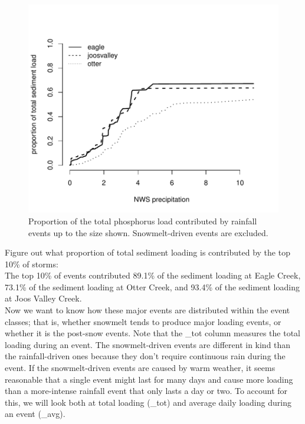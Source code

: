 \documentclass[12pt]{article}
\begin{document}
\begin{figure}
    \begin{center}
\includegraphics{loadings-figure1}
    \end{center}
    \caption{Proportion of the total phosphorus load contributed by rainfall events up to the size shown. Snowmelt-driven events are excluded.\label{cdf}}
\end{figure}



Figure out what proportion of total sediment loading is contributed by the top 10\% of storms:\\








The top 10\% of events contributed 89.1\% of the sediment loading at Eagle Creek, 73.1\% of the sediment loading at Otter Creek, and 93.4\% of the sediment loading at Joos Valley Creek.\\

Now we want to know how these major events are distributed within the event classes; that is, whether snowmelt tends to produce major loading events, or whether it is the post-snow events. Note that the \_tot column measures the total loading during an event. The snowmelt-driven events are different in kind than the rainfall-driven ones because they don't require continuous rain during the event. If the snowmelt-driven events are caused by warm weather, it seems reasonable that a single event might last for many days and cause more loading than a more-intense rainfall event that only lasts a day or two. To account for this, we will look both at total loading (\_tot) and average daily loading during an event (\_avg).\\
\end{document}
